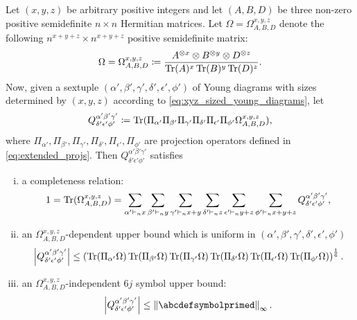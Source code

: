 \documentclass[notitlepage, 10pt]{article}
\begin{document}
\begin{prop}
    \label{prop:omega_and_Q}
    Let $(x,y,z)$ be arbitrary positive integers and let $(A,B,D)$ be three non-zero positive semidefinite $n \times n$ Hermitian matrices.
    Let $\Omega = \Omega_{A,B,D}^{x,y,z}$ denote the following $n^{x+y+z} \times n^{x+y+z}$ positive semidefinite matrix:
    \begin{equation}
        \Omega = \Omega_{A,B,D}^{x,y,z} \coloneqq \frac{A^{\otimes x}\otimes B^{\otimes y} \otimes D^{\otimes z}}{\operatorname{Tr}(A)^{x}\operatorname{Tr}(B)^{y}\operatorname{Tr}(D)^{z}}.
    \end{equation}
    Now, given a sextuple $(\alpha', \beta', \gamma', \delta', \epsilon', \phi')$ of Young diagrams with sizes determined by $(x,y,z)$ according to \cref{eq:xyz_sized_young_diagrams}, let 
    \begin{equation}
        \label{eq:Q_quantity}
        Q^{\alpha'\beta'\gamma'}_{\delta'\epsilon'\phi'}
        \coloneqq 
        \operatorname{Tr}(\Pi_{\alpha'}\Pi_{\beta'}\Pi_{\gamma'}\Pi_{\delta'}\Pi_{\epsilon'}\Pi_{\phi'}\Omega_{A,B,D}^{x,y,z}),
    \end{equation}
    where $\Pi_{\alpha'}, \Pi_{\beta'}, \Pi_{\gamma'}, \Pi_{\delta'}, \Pi_{\epsilon'}, \Pi_{\phi'}$ are projection operators defined in \cref{eq:extended_projs}.
    Then $Q^{\alpha'\beta'\gamma'}_{\delta'\epsilon'\phi'}$ satisfies
    \begin{enumerate}[(i)]
        \item a completeness relation:
        \begin{equation}
            \label{eq:completeness_relation}
            1 = \operatorname{Tr}(\Omega_{A,B,D}^{x,y,z}) = 
            \sum_{\alpha'\vdash_n x} 
            \sum_{\beta'\vdash_n y} 
            \sum_{\gamma'\vdash_n x+y} 
            \sum_{\delta'\vdash_n z} 
            \sum_{\epsilon'\vdash_n y+z} 
            \sum_{\phi'\vdash_n x+y+z} 
            Q^{\alpha'\beta'\gamma'}_{\delta'\epsilon'\phi'},
        \end{equation}
    \item an $\Omega_{A,B,D}^{x,y,z}$-dependent upper bound which is uniform in $(\alpha',\beta',\gamma',\delta',\epsilon',\phi')$
        \begin{equation}
            \label{eq:Q_pre_upper_bound}
            \left|Q^{\alpha'\beta'\gamma'}_{\delta'\epsilon'\phi'}\right|
            \leq \left(\operatorname{Tr}(\Pi_{\alpha'}\Omega)\operatorname{Tr}(\Pi_{\beta'} \Omega)\operatorname{Tr}(\Pi_{\gamma'}\Omega)\operatorname{Tr}(\Pi_{\delta'}\Omega)\operatorname{Tr}(\Pi_{\epsilon'}\Omega)\operatorname{Tr}(\Pi_{\phi'}\Omega)\right)^{\frac{1}{6}}.
        \end{equation}
        \item an $\Omega_{A,B,D}^{x,y,z}$-independent $6j$ symbol upper bound:
        \begin{equation}
            \label{eq:Q_sixj_upper_bound}
            \abs{Q^{\alpha'\beta'\gamma'}_{\delta'\epsilon'\phi'}}
            \leq \norm{\abcdefsymbolprimed}_{\infty}.
        \end{equation}
    \end{enumerate}
\end{prop}
\end{document}
